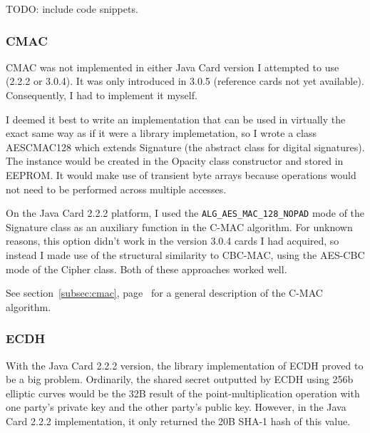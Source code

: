 \documentclass[12pt]{article}
\begin{document}
TODO: include code snippets. 




\subsubsection{CMAC}
\label{cmac_impl}

CMAC was not implemented in either Java Card version I attempted to use (2.2.2 or 3.0.4). It was only introduced in 3.0.5 (reference cards not yet available). Consequently, I had to implement it myself. 

I deemed it best to write an implementation that can be used in virtually the exact same way as if it were a library implemetation, so I wrote a class AESCMAC128 which extends Signature (the abstract class for digital signatures). The instance would be created in the Opacity class constructor and stored in EEPROM. It would make use of transient byte arrays because operations would not need to be performed across multiple accesses.

On the Java Card 2.2.2 platform, I used the \verb|ALG_AES_MAC_128_NOPAD| mode of the Signature class as an auxiliary function in the C-MAC algorithm. For unknown reasons, this option didn't work in the version 3.0.4 cards I had acquired, so instead I made use of the structural similarity to CBC-MAC, using the AES-CBC mode of the Cipher class. Both of these approaches worked well.


See section~\ref{subsec:cmac}, page~\pageref{subsec:cmac} for a general description of the C-MAC algorithm.

\subsubsection{ECDH}
With the Java Card 2.2.2 version, the library implementation of ECDH proved to be a big problem. Ordinarily, the shared secret outputted by ECDH using 256b elliptic curves would be the 32B result of the point-multiplication operation with one party's private key and the other party's public key. However, in the Java Card 2.2.2 implementation, it only returned the 20B SHA-1 hash of this value.
\end{document}
